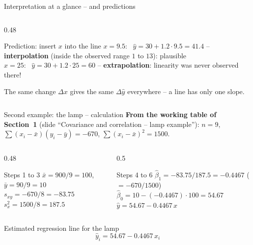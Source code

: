 \documentclass[aspectratio=169,11pt]{beamer}
\newcommand{\minlineskip}{%
  \setlength{\lineskiplimit}{2pt}\setlength{\lineskip}{2pt}%
  \setlength{\normallineskiplimit}{2pt}\setlength{\normallineskip}{2pt}}
\begin{document}
\begin{frame}{Interpretation at a glance -- and predictions}
\begin{columns}[T]
\begin{column}{0.48\textwidth}
      \begin{exampleblock}{Prediction: insert $x$ into the line}
        $x = 9.5$: \ $\hat{y} = 30 + 1.2 \cdot 9.5 = 41.4$ -- \textbf{interpolation}
        (inside the observed range $1$ to $13$): plausible\\[3pt]
        $x = 25$: \ $\hat{y} = 30 + 1.2 \cdot 25 = 60$ -- \textbf{extrapolation}:
        linearity was never observed there!
      \end{exampleblock}
      \footnotesize The same change $\Delta x$ gives the same $\Delta\hat{y}$
      everywhere -- a line has only one slope.
    \end{column}
  \end{columns}
\end{frame}

\begin{frame}{Second example: the lamp -- calculation}
  \textbf{From the working table of Section~1} (slide ``Covariance and
  correlation -- lamp example''): $n=9$,
  $\sum(x_i-\bar x)(y_i-\bar y)=-670$, $\sum(x_i-\bar x)^2=1500$.
  \begin{columns}[T]
    \begin{column}{0.48\textwidth}
      \begin{block}{Steps 1 to 3}
        \minlineskip
        $\bar{x} = 900/9 = 100$, \quad $\bar{y} = 90/9 = 10$ \\[2pt]
        $s_{xy} = -670/8 = -83.75$ \\[2pt]
        $s_x^{2} = 1500/8 = 187.5$
      \end{block}
    \end{column}
    \begin{column}{0.5\textwidth}
      \begin{block}{Steps 4 to 6}
        \minlineskip
        $\hat{\beta}_1 = -83.75 / 187.5 = \mathbf{-0.4467}$
        \quad ($=-670/1500$) \\[2pt]
        $\hat{\beta}_0 = 10 - (-0.4467)\cdot 100 = \mathbf{54.67}$ \\[2pt]
        $\hat{y} = 54.67 - 0.4467\,x$
      \end{block}
    \end{column}
  \end{columns}
  \begin{exampleblock}{Estimated regression line for the lamp}
    \[
      \hat y_i = 54.67-0.4467\,x_i
    \]
  \end{exampleblock}
\end{frame}
\end{document}
